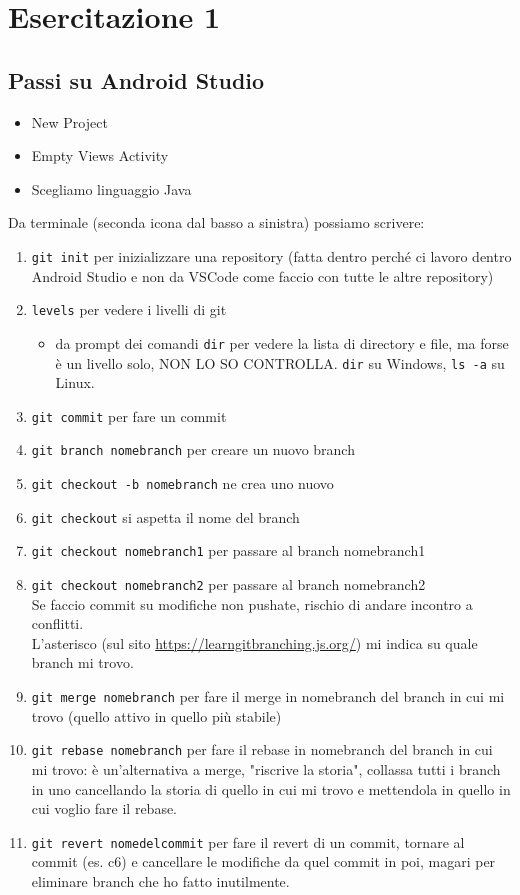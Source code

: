 
\chapter{Esercitazione 1}
\section{Passi su Android Studio}
\begin{itemize}
    \item New Project
    \item Empty Views Activity
    \item Scegliamo linguaggio Java
\end{itemize}
\par Da terminale (seconda icona dal basso a sinistra) possiamo scrivere:
\begin{enumerate}
    \item \texttt{git init} per inizializzare una repository (fatta dentro perché ci lavoro dentro Android Studio e non da VSCode come faccio con tutte le altre repository)
    \item \texttt{levels} per vedere i livelli di git
    \begin{itemize}
        \item da prompt dei comandi \texttt{dir} per vedere la lista di directory e file, ma forse è un livello solo, NON LO SO CONTROLLA. \texttt{dir} su Windows, \texttt{ls -a} su Linux.
    \end{itemize}
    \item \texttt{git commit} per fare un commit
    \item \texttt{git branch nomebranch} per creare un nuovo branch
    \item \texttt{git checkout -b nomebranch} ne crea uno nuovo
    \item \texttt{git checkout} si aspetta il nome del branch
    \item \texttt{git checkout nomebranch1} per passare al branch nomebranch1
    \item \texttt{git checkout nomebranch2} per passare al branch nomebranch2\\
    Se faccio commit su modifiche non pushate, rischio di andare incontro a conflitti.\\
    L'asterisco (sul sito \url{https://learngitbranching.js.org/}) mi indica su quale branch mi trovo.
    \item \texttt{git merge nomebranch} per fare il merge in nomebranch del branch in cui mi trovo (quello attivo in quello più stabile)
    \item \texttt{git rebase nomebranch} per fare il rebase in nomebranch del branch in cui mi trovo: è un'alternativa a merge, "riscrive la storia", collassa tutti i branch in uno cancellando la storia di quello in cui mi trovo e mettendola in quello in cui voglio fare il rebase.
    \item \texttt{git revert nomedelcommit} per fare il revert di un commit, tornare al commit (es. c6) e cancellare le modifiche da quel commit in poi, magari per eliminare branch che ho fatto inutilmente.
\end{enumerate}
